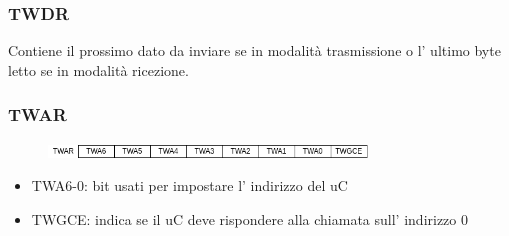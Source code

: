 \subsubsection{TWDR}
Contiene il prossimo dato da inviare se in modalità trasmissione o l' ultimo byte letto se in modalità ricezione.

\subsubsection{TWAR}
\begin{figure}[H]
    \centering
    \includegraphics[width=320px]{images/24_I2C-TWI/TWAR.png}
\end{figure}
\begin{itemize}
    \item TWA6-0: bit usati per impostare l' indirizzo del uC
    \item TWGCE: indica se il uC deve rispondere alla chiamata sull' indirizzo 0
\end{itemize}


